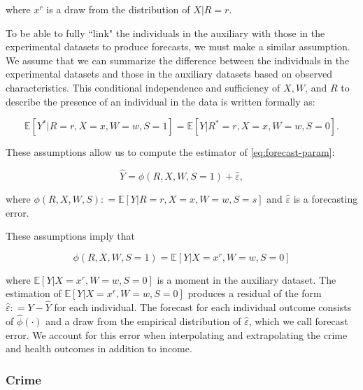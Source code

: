 \noindent where $x^r$ is a draw from the distribution of $X | R = r$.

To be able to fully ``link" the individuals in the auxiliary with those in the experimental datasets to produce forecasts, we must make a similar assumption. We assume that we can summarize the difference between the individuals in the experimental datasets and those in the auxiliary datasets based on observed characteristics. This conditional independence and sufficiency of $X, W$, and $R$ to describe the presence of an individual in the data is written formally as:

\begin{equation}
\mathbb{E} \left[ Y^* | R = r, X = x, W = w, S = 1 \right] = \mathbb{E} \left[ Y | R^* = r , X = x, W = w, S = 0\right].
\end{equation}

These assumptions allow us to compute the estimator of \eqref{eq:forecast-param}: 

\begin{equation}
\widehat{Y} = \widehat{\phi} \left( R, X, W, S = 1 \right) + \widehat{\varepsilon},   \label{eq:additive}
\end{equation}

\noindent where $\phi \left( R, X, W, S \right) : = \mathbb{E} \left[ Y | R = r, X = x, W = w, S = s \right] $ and $\widehat{\varepsilon}$ is a forecasting error. 

These assumptions imply that

\begin{equation}
\phi \left( R, X, W, S = 1 \right) = \mathbb{E} \left[ Y | X = x^r, W = w, S = 0 \right]
\end{equation}

\noindent where $\mathbb{E} \left[ Y | X = x^r, W = w, S = 0 \right]$ is a moment in the auxiliary dataset. The estimation of $\mathbb{E} \left[ Y | X = x^r, W = w, S = 0 \right]$ produces a residual of the form $\widehat{\varepsilon} : = Y - \widehat{Y}$ for each individual. The forecast for each  individual outcome consists of $\widehat{\phi} \left( \cdot \right)$ and a draw from the empirical distribution of $\widehat{\varepsilon}$, which we call forecast error. We account for this error when interpolating and extrapolating the crime and health outcomes in addition to income.

\subsubsection{Crime}  \label{sec:crime}

